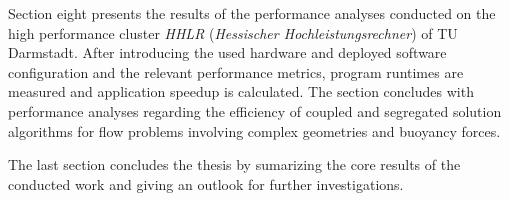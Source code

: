 Section eight presents the results of the performance analyses conducted on the high performance cluster \emph{HHLR} (\emph{Hessischer Hochleistungsrechner}) of TU Darmstadt. After introducing the used hardware and deployed software configuration and the relevant performance metrics, program runtimes are measured and application speedup is calculated. The section concludes with performance analyses regarding the efficiency of coupled and segregated solution algorithms for flow problems involving complex geometries and buoyancy forces.

The last section concludes the thesis by sumarizing the core results of the conducted work and giving an outlook for further investigations.


